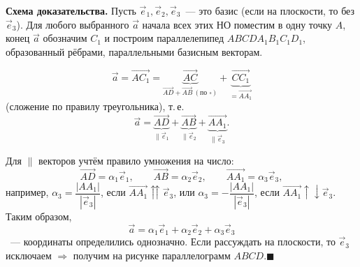 \documentclass[a4paper,11pt]{article}
\newcommand{\qedr}{\hfill$\blacksquare$}
\begin{document}
\textbf{Схема доказательства.} Пусть $\vec e_1,\vec e_2,\vec e_3$~--- это базис (если на плоскости, то без
$\vec e_3$). Для любого выбранного $\vec a$ начала всех этих НО поместим в одну точку $A$, конец $\vec a$
обозначим $C_1$ и построим параллелепипед $ABCDA_1B_1C_1D_1$, образованный рёбрами, параллельными
базисным векторам.

\begin{minipage}[c]{0.5\linewidth}
\centering
{}
\end{minipage}\hfill
\begin{minipage}[c]{0.48\linewidth}
\[
\vec a=\overrightarrow{AC_1}=\underbrace{\overrightarrow{AC}}_{\overrightarrow{AD}+\overrightarrow{AB}\ (\text{по }\square)}
+\underbrace{\overrightarrow{CC_1}}_{=\overrightarrow{AA_1}}
\]
(сложение по правилу треугольника), т.\,е.
\[
\vec a=\underbrace{\overrightarrow{AD}}_{\parallel\vec e_1}+\underbrace{\overrightarrow{AB}}_{\parallel\vec e_2}
+\underbrace{\overrightarrow{AA_1}}_{\parallel\vec e_3}.
\]
\end{minipage}

Для $\parallel$ векторов учтём правило умножения на число:
\[
\overrightarrow{AD}=\alpha_1\vec e_1,\qquad \overrightarrow{AB}=\alpha_2\vec e_2,\qquad \overrightarrow{AA_1}=\alpha_3\vec e_3,
\]
например, $\alpha_3=\dfrac{|AA_1|}{|\vec e_3|}$, если $\overrightarrow{AA_1}\upuparrows\vec e_3$, или
$\alpha_3=-\dfrac{|AA_1|}{|\vec e_3|}$, если $\overrightarrow{AA_1}\uparrow\downarrow\vec e_3$. Таким образом,
\[
\vec a=\alpha_1\vec e_1+\alpha_2\vec e_2+\alpha_3\vec e_3
\]
~---
координаты определились однозначно. Если рассуждать на плоскости, то $\vec e_3$ исключаем
$\Rightarrow$ получим на рисунке параллелограмм $ABCD$.\qedr
\end{document}

